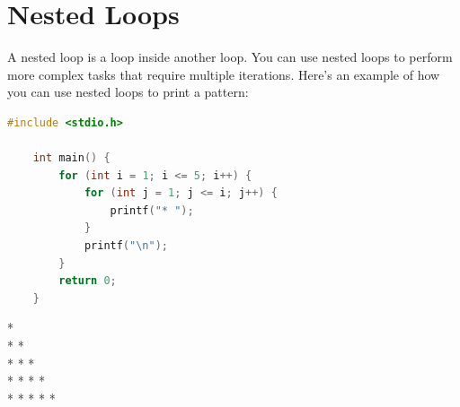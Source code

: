 \documentclass[12pt, openany]{book}
\begin{document}
\section{Nested Loops}
A nested loop is a loop inside another loop. You can use nested loops to perform more complex tasks that require multiple iterations. Here's an example of how you can use nested loops to print a pattern:
\begin{lstlisting}[language=C, gobble=0, caption=Using Nested Loops in C]
    #include <stdio.h>
    
    int main() {
        for (int i = 1; i <= 5; i++) {
            for (int j = 1; j <= i; j++) {
                printf("* ");
            }
            printf("\n");
        }
        return 0;
    }
\end{lstlisting}
\begin{tcolorbox}[colback=lightgray!10, colframe=black, title=Output]
    * \\
    * * \\
    * * * \\
    * * * * \\
    * * * * *
\end{tcolorbox}
\end{document}
